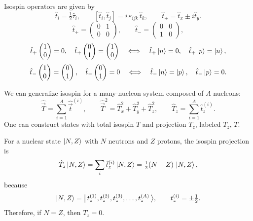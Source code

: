 \documentclass[11pt,a4paper]{article}
\newcommand{\op}[1]{\hat{#1}}
\begin{document}
Isospin operators are given by 
\[
\op t_i = \tfrac12\op\tau_i ,\qquad
[\op t_i,\op t_j] = i\,\varepsilon_{ijk}\,\op t_k ,\qquad
\op t_\pm = \op t_x \pm i\op t_y .
\]
\[
\op t_+=\begin{pmatrix}0&1\\0&0\end{pmatrix},\qquad
\op t_-=\begin{pmatrix}0&0\\1&0\end{pmatrix},
\]
\[
\op t_+\begin{pmatrix}1\\0\end{pmatrix}=0,\quad
\op t_+\begin{pmatrix}0\\1\end{pmatrix}=\begin{pmatrix}1\\0\end{pmatrix}
\quad\Longleftrightarrow\quad \op t_+\ket{n}=0 , \quad \op t_+\ket{p}=\ket{n},
\]
\[
\op t_-\begin{pmatrix}1\\0\end{pmatrix}=\begin{pmatrix}0\\1\end{pmatrix},\quad
\op t_-\begin{pmatrix}0\\1\end{pmatrix}=0
\quad\Longleftrightarrow\quad \op t_-\ket{n}=\ket{p}, \quad \op t_-\ket{p}= 0.
\]


We can generalize isospin for a many-nucleon system composed of $A$ nucleons:
\[
\op{\vec T}=\sum_{i=1}^A \op{\vec t}^{(i)} ,\qquad
\op {\vec T}^2=\op T_x^2+\op T_y^2+\op T_z^2,\qquad
\op T_z=\sum_{i=1}^{A}\op t_z^{(i)}.
\]
One can construct states with total isospin $T$ and projection $T_z$, labeled
$T_z,\,T$.

For a nuclear state $\ket{N,Z}$ with $N$ neutrons and $Z$ protons, the isospin
projection is
\[
\op T_z\ket{N,Z}=\sum_i \op t_z^{(i)}\ket{N,Z}=\tfrac12(N-Z)\,\ket{N,Z},
\]
because
\[
\ket{N,Z}=\big|\, t_z^{(1)},t_z^{(2)},t_z^{(3)},\dots,t_z^{(A)}\,\big\rangle,
\qquad t_z^{(i)}=\pm\tfrac12 .
\]
Therefore, if $N=Z$, then $T_z=0$.
\end{document}
